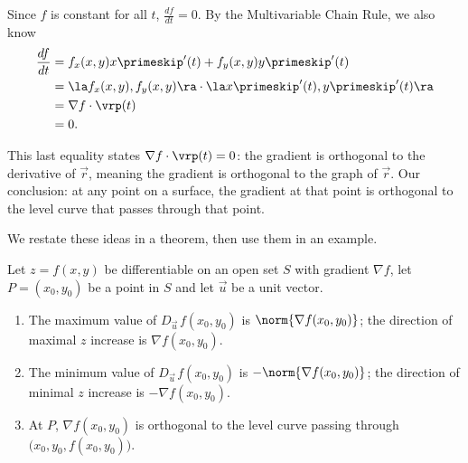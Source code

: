 Since $f$ is constant for all $t$, $\frac{df}{dt} = 0$. By the Multivariable Chain Rule, we also know
\begin{align*}
\frac{df}{dt} &= f_x(x,y)x\primeskip'(t) + f_y(x,y)y\primeskip'(t)\\						
						&= \la f_x(x,y),f_y(x,y)\ra \cdot \la x\primeskip'(t),y\primeskip'(t)\ra\\
						&= \nabla f \cdot \vrp(t)\\
						&=0.
\end{align*}

This last equality states $\nabla f \cdot \vrp(t) = 0$: the gradient is orthogonal to the derivative of $\vec r$, meaning the gradient is orthogonal to the graph of $\vec r$. Our conclusion: at any point on a surface, the gradient at that point is orthogonal to the level curve that passes through that point.

We restate these ideas in a theorem, then use them in an example.
\enlargethispage{4\baselineskip}

{Let $z=f(x,y)$ be differentiable on an open set $S$ with gradient $\nabla f$, let $P=(x_0,y_0)$ be a point in $S$ and let $\vec u$ be a unit vector.
\begin{enumerate}
	\item The maximum value of $D_{\vec u\,}f(x_0,y_0)$ is $\norm{\nabla f(x_0,y_0)}$; the direction of maximal $z$ increase is $\nabla f(x_0,y_0)$.
	\item   The minimum value of $D_{\vec u\,}f(x_0,y_0)$ is $-\norm{\nabla f(x_0,y_0)}$; the direction of minimal $z$ increase is $-\nabla f(x_0,y_0)$.
	\item At $P$, $\nabla f(x_0,y_0)$ is orthogonal to the level curve passing through $\big(x_0,y_0,f(x_0,y_0)\big)$.
\end{enumerate}
}

